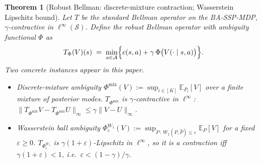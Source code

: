 \documentclass[11pt]{article}
\newtheorem{theorem}{Theorem}
\theoremstyle{definition}
\theoremstyle{remark}
\begin{document}
\begin{theorem}[Robust Bellman: discrete-mixture contraction; Wasserstein Lipschitz bound]\label{thm:bellman}
Let $T$ be the standard Bellman operator on the BA-SSP-MDP,
$\gamma$-contractive in $\ell^\infty(\mathcal S)$. Define the
\emph{robust} Bellman operator with ambiguity functional $\Phi$ as
\[
T_\Phi(V)(s) \;=\; \min_{a\in\mathcal{A}}\Bigl\{
  c(s,a) + \gamma\,\Phi\bigl(V(\cdot \mid s,a)\bigr)\Bigr\}.
\]
Two concrete instances appear in this paper.
\begin{itemize}[leftmargin=1.2em,itemsep=0.15em]
\item[\textbf{(a)}] \emph{Discrete-mixture ambiguity}
$\Phi^{\mathrm{mix}}(V) := \sup_{i\in[K]} \mathbb{E}_{P_i}[V]$ over a finite
mixture of posterior modes. $T_{\Phi^{\mathrm{mix}}}$ is
$\gamma$-contractive in $\ell^\infty$:
$\|T_{\Phi^{\mathrm{mix}}}V - T_{\Phi^{\mathrm{mix}}}U\|_\infty \leq \gamma\|V-U\|_\infty$.
\item[\textbf{(b)}] \emph{Wasserstein ball ambiguity}
$\Phi^{W_1}_\varepsilon(V) := \sup_{P\,:\,W_1(P,\hat P)\leq\varepsilon}
\mathbb{E}_P[V]$ for a fixed $\varepsilon\!\geq\!0$.
$T_{\Phi^{W_1}_\varepsilon}$ is $\gamma(1+\varepsilon)$-Lipschitz in
$\ell^\infty$, so it is a contraction iff $\gamma(1+\varepsilon)<1$,
i.e.\ $\varepsilon < (1-\gamma)/\gamma$.
\end{itemize}
\end{theorem}
\end{document}
